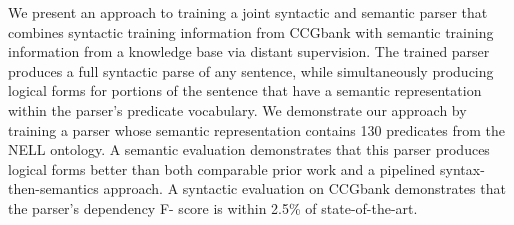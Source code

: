 We present an approach to training a joint syntactic and semantic parser that combines syntactic training information from CCGbank with semantic training information from a knowledge base via distant supervision. The trained parser produces a full syntactic parse of any sentence, while simultaneously producing logical forms for portions of the sentence that have a semantic representation within the parser's predicate vocabulary. We demonstrate our approach by training a parser whose semantic representation contains 130 predicates from the NELL ontology. A semantic evaluation demonstrates that this parser produces logical forms better than both comparable prior work and a pipelined syntax-then-semantics approach. A syntactic evaluation on CCGbank demonstrates that the parser's dependency F- score is within 2.5\% of state-of-the-art.
